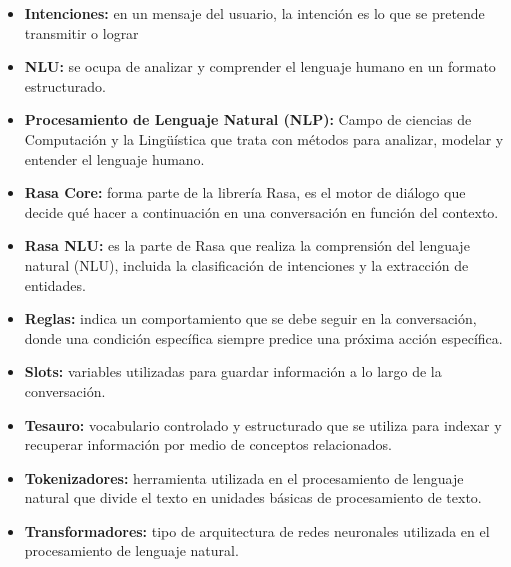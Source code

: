 \begin{itemize}
	\item \textbf{Intenciones:} en un mensaje del usuario, la intención es lo que se pretende transmitir o lograr
	\item \textbf{NLU:} se ocupa de analizar y comprender el lenguaje humano en un formato estructurado.
	\item \textbf{Procesamiento de Lenguaje Natural (NLP):} Campo de ciencias de Computación y la Lingüística que trata con métodos para analizar, modelar y entender el lenguaje humano.
	\item \textbf{Rasa Core:} forma parte de la librería Rasa, es el motor de diálogo que decide qué hacer a continuación en una conversación en función del contexto.
	\item \textbf{Rasa NLU:} es la parte de Rasa que realiza la comprensión del lenguaje natural (NLU), incluida la clasificación de intenciones y la extracción de entidades.
	\item \textbf{Reglas:} indica un comportamiento que se debe seguir en la conversación, donde una condición específica siempre predice una próxima acción específica.
	\item \textbf{Slots:} variables utilizadas para guardar información a lo largo de la conversación.
	\item \textbf{Tesauro:} vocabulario controlado y estructurado que se utiliza para indexar y recuperar información por medio de conceptos relacionados.
	\item \textbf{Tokenizadores:} herramienta utilizada en el procesamiento de lenguaje natural que divide el texto en unidades básicas de procesamiento de texto.
	\item \textbf{Transformadores:} tipo de arquitectura de redes neuronales utilizada en el procesamiento de lenguaje natural.
\end{itemize}
